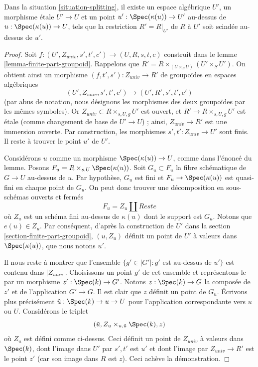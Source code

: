 \begin{lemma}
\label{lemma-splitting}
Dans la situation \ref{situation-splitting},
il existe un espace algébrique $U'$, un morphisme \'etale
$U' \to U$ et un point $u' : \Spec(\kappa(u)) \to U'$
au-dessus de $u : \Spec(\kappa(u)) \to U$,
tels que la restriction $R' = R|_{U'}$ de $R$ à $U'$
soit scindée au-dessus de $u'$.
\end{lemma}

\begin{proof}
Soit $f : (U', Z_{univ}, s', t', c') \to (U, R, s, t, c)$ construit dans le
lemme \ref{lemma-finite-part-groupoid}.
Rappelons que $R' = R \times_{(U \times_S U)} (U' \times_S U')$.
On obtient ainsi un morphisme $(f, t', s') : Z_{univ} \to R'$ de groupoïdes
en espaces algébriques
$$
(U', Z_{univ}, s', t', c') \to (U', R', s', t', c')
$$
(par abus de notation, nous désignons les morphismes des deux groupoïdes
par les mêmes symboles). Or $Z_{univ} \subset R \times_{s, U, g} U'$ est ouvert,
et $R' \to R \times_{s, U, g} U'$ est \'etale (comme changement de base
de $U' \to U$) ; ainsi, $Z_{univ} \to R'$ est une immersion ouverte.
Par construction, les morphismes $s', t' : Z_{univ} \to U'$ sont finis.
Il reste à trouver le point $u'$ de $U'$.

\medskip\noindent
Considérons $u$ comme un morphisme $\Spec(\kappa(u)) \to U$, comme dans
l'énoncé du lemme. Posons $F_u = R \times_{s, U} \Spec(\kappa(u))$.
Soit $G_u \subset F_u$ la fibre schématique de $G \to U$ au-dessus de $u$.
Par hypothèse, $G_u$ est fini et $F_u \to \Spec(\kappa(u))$
est quasi-fini en chaque point de $G_u$.
On peut donc trouver une décomposition en sous-schémas ouverts et fermés
$$
F_u = Z_u \amalg Reste
$$
où $Z_u$ est un schéma fini au-dessus de $\kappa(u)$ dont le support est $G_u$.
Notons que $e(u) \in Z_u$. Par conséquent, d'après la construction de $U'$ dans la
section \ref{section-finite-part-groupoid},
$(u, Z_u)$ définit un point de $U'$ à valeurs dans
$\Spec(\kappa(u))$, que nous notons $u'$.

\medskip\noindent
Il nous reste à montrer que l'ensemble $\{g' \in |G'| : g'\text{ est au-dessus de }u'\}$
est contenu dans $|Z_{univ}|$. Choisissons un point $g'$ de cet ensemble et
représentons-le par un morphisme $z' : \Spec(k) \to G'$. Notons
$z : \Spec(k) \to G$ la composée de $z'$ et de l'application $G' \to G$.
Il est clair que $z$ définit un point de $G_u$. Écrivons plus précisément
$\tilde u : \Spec(k) \to u \to U$ pour l'application correspondante vers $u$ ou $U$.
Considérons le triplet
$$
(\tilde u, Z_u \times_{u, \tilde u} \Spec(k), z)
$$
où $Z_u$ est défini comme ci-dessus. Ceci définit un point de $Z_{univ}$
à valeurs dans $\Spec(k)$, dont l'image dans $U'$ par $s', t'$ est $u'$ et
dont l'image par $Z_{univ} \to R'$ est le point $z'$
(car son image dans $R$ est $z$).
Ceci achève la démonstration.
\end{proof}

